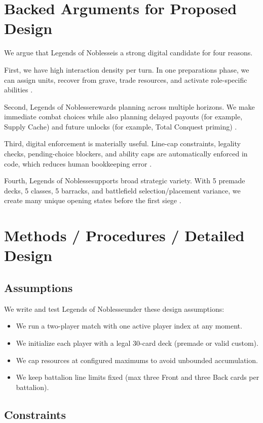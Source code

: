 \documentclass[12pt]{article}
\newcommand{\GameName}{Legends of Noblesse}
\begin{document}
\section{Backed Arguments for Proposed Design}
We argue that \GameName is a strong digital candidate for four reasons.

First, we have high interaction density per turn. In one preparations phase, we can assign units, recover from grave, trade resources, and activate role-specific abilities \cite{engine,gameui}.

Second, \GameName rewards planning across multiple horizons. We make immediate combat choices while also planning delayed payouts (for example, Supply Cache) and future unlocks (for example, Total Conquest priming) \cite{engine}.

Third, digital enforcement is materially useful. Line-cap constraints, legality checks, pending-choice blockers, and ability caps are automatically enforced in code, which reduces human bookkeeping error \cite{engine,models,player}.

Fourth, \GameName supports broad strategic variety. With 5 premade decks, 5 classes, 5 barracks, and battlefield selection/placement variance, we create many unique opening states before the first siege \cite{premadedecks,selectui}.

\section{Methods / Procedures / Detailed Design}
\subsection{Assumptions}
We write and test \GameName under these design assumptions:
\begin{itemize}
    \item We run a two-player match with one active player index at any moment.
    \item We initialize each player with a legal 30-card deck (premade or valid custom).
    \item We cap resources at configured maximums to avoid unbounded accumulation.
    \item We keep battalion line limits fixed (max three Front and three Back cards per battalion).
\end{itemize}

\subsection{Constraints}
\end{document}
